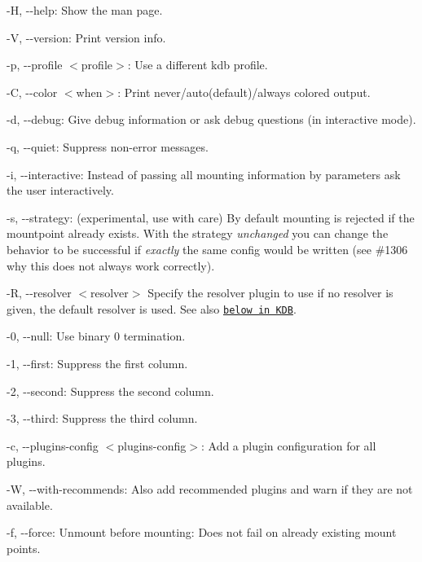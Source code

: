 \begin{DoxyItemize}
\item {\ttfamily -\/H}, {\ttfamily -\/-\/help}\+: Show the man page.
\item {\ttfamily -\/V}, {\ttfamily -\/-\/version}\+: Print version info.
\item {\ttfamily -\/p}, {\ttfamily -\/-\/profile $<$profile$>$}\+: Use a different kdb profile.
\item {\ttfamily -\/C}, {\ttfamily -\/-\/color $<$when$>$}\+: Print never/auto(default)/always colored output.
\item {\ttfamily -\/d}, {\ttfamily -\/-\/debug}\+: Give debug information or ask debug questions (in interactive mode).
\item {\ttfamily -\/q}, {\ttfamily -\/-\/quiet}\+: Suppress non-\/error messages.
\item {\ttfamily -\/i}, {\ttfamily -\/-\/interactive}\+: Instead of passing all mounting information by parameters ask the user interactively.
\item {\ttfamily -\/s}, {\ttfamily -\/-\/strategy}\+: (experimental, use with care) By default mounting is rejected if the mountpoint already exists. With the strategy {\itshape unchanged} you can change the behavior to be successful if {\itshape exactly} the same config would be written (see \#1306 why this does not always work correctly).
\item {\ttfamily -\/R}, {\ttfamily -\/-\/resolver $<$resolver$>$} Specify the resolver plugin to use if no resolver is given, the default resolver is used. See also \href{#KDB}{\tt below in K\+DB}.
\item {\ttfamily -\/0}, {\ttfamily -\/-\/null}\+: Use binary 0 termination.
\item {\ttfamily -\/1}, {\ttfamily -\/-\/first}\+: Suppress the first column.
\item {\ttfamily -\/2}, {\ttfamily -\/-\/second}\+: Suppress the second column.
\item {\ttfamily -\/3}, {\ttfamily -\/-\/third}\+: Suppress the third column.
\item {\ttfamily -\/c}, {\ttfamily -\/-\/plugins-\/config $<$plugins-\/config$>$}\+: Add a plugin configuration for all plugins.
\item {\ttfamily -\/W}, {\ttfamily -\/-\/with-\/recommends}\+: Also add recommended plugins and warn if they are not available.
\item {\ttfamily -\/f}, {\ttfamily -\/-\/force}\+: Unmount before mounting\+: Does not fail on already existing mount points.
\end{DoxyItemize}

